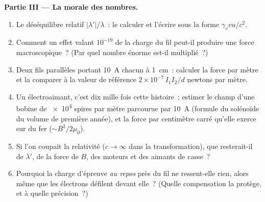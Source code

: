 \begin{problem}
\medskip\noindent\textbf{Partie III --- La morale des nombres.}
\begin{enumerate}[resume]
  \item Le déséquilibre relatif $|\lambda'|/\lambda$~: le calculer et
        l'écrire sous la forme $\gamma_v vu/c^2$.
  \item Comment un effet valant $10^{-19}$ de la charge du fil peut-il
        produire une force macroscopique~? (Par quel nombre énorme
        est-il multiplié~?)
  \item Deux fils parallèles portant \qty{10}{A} chacun à \qty{1}{cm}~:
        calculer la force par mètre et la comparer à la valeur de
        référence $2 \times 10^{-7}\,I_1I_2/d$ newtons par mètre.
  \item Un électroaimant, c'est dix mille fois cette histoire~:
        estimer le champ d'une bobine de \qty{e4}{} spires par mètre
        parcourue par \qty{10}{A} (formule du solénoïde du volume de
        première année), et la force par centimètre carré qu'elle
        exerce sur du fer ($\sim B^2/2\mu_0$).
  \item Si l'on coupait la relativité ($c \to \infty$ dans la
        transformation), que resterait-il de $\lambda'$, de la force de
        $B$, des moteurs et des aimants de casse~?
  \item Pourquoi la charge d'épreuve \emph{au repos} près du fil ne
        ressent-elle rien, alors même que les électrons défilent devant
        elle~? (Quelle compensation la protège, et à quelle précision~?)
\end{enumerate}


\end{problem}
